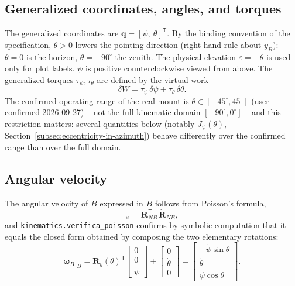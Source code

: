 \documentclass[11pt,a4paper]{article}
\numberwithin{equation}{section}
\newcommand{\bs}[1]{\boldsymbol{#1}}
\newcommand{\T}{^{\mathsf T}}
\begin{document}
\subsection{Generalized coordinates, angles, and torques}
\label{subsec:angoli}

The generalized coordinates are $\bs q = [\psi,\ \theta]\T$. By the binding convention of the specification, $\theta>0$ lowers the pointing direction (right-hand rule about $y_B$): $\theta=0$ is the horizon, $\theta=-90^\circ$ the zenith. The physical elevation $\varepsilon=-\theta$ is used only for plot labels. $\psi$ is positive counterclockwise viewed from above. The generalized torques $\tau_\psi,\tau_\theta$ are defined by the virtual work
\begin{equation}
\delta W = \tau_\psi\,\delta\psi + \tau_\theta\,\delta\theta .
\end{equation}
The confirmed operating range of the real mount is $\theta \in [-45^\circ, 45^\circ]$ (user-confirmed 2026-09-27) -- not the full kinematic domain $[-90^\circ,0^\circ]$ -- and this restriction matters: several quantities below (notably $J_\psi(\theta)$, Section~\ref{subsec:eccentricity-in-azimuth}) behave differently over the confirmed range than over the full domain.

\subsection{Angular velocity}

The angular velocity of $B$ expressed in $B$ follows from Poisson's formula,
\begin{equation}
[\bs\omega_B|_B]_\times = \bs R_{NB}\T\,\dot{\bs R}_{NB},
\end{equation}
and \texttt{kinematics.verifica\_poisson} confirms by symbolic computation that it equals the closed form obtained by composing the two elementary rotations:
\begin{equation}
\bs\omega_B\big|_B = \bs R_y(\theta)\T\begin{bmatrix}0\\0\\\dot\psi\end{bmatrix} + \begin{bmatrix}0\\\dot\theta\\0\end{bmatrix}
= \begin{bmatrix}-\dot\psi\sin\theta\\ \dot\theta\\ \dot\psi\cos\theta\end{bmatrix}.
\label{eq:omegaB}
\end{equation}
\end{document}
